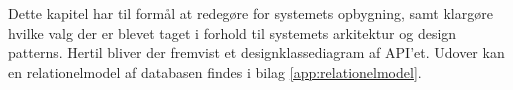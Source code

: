 Dette kapitel har til formål at redegøre for systemets opbygning, samt klargøre hvilke valg 
der er blevet taget i forhold til systemets arkitektur og design patterns. Hertil bliver der fremvist et 
designklassediagram af API'et. Udover kan en relationelmodel af databasen findes i bilag \ref{app:relationelmodel}.